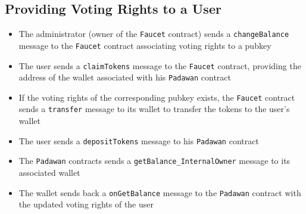 \subsection{Providing Voting Rights to a User}

\begin{itemize}
\item The administrator (owner of the {\tt Faucet} contract) sends a {\tt changeBalance} message to the {\tt Faucet} contract associating voting rights to a pubkey
\item The user sends a {\tt claimTokens} message to the {\tt Faucet} contract, providing the address of the wallet associated with his {\tt Padawan} contract
\item If the voting rights of the corresponding pubkey exists, the {\tt Faucet} contract sends a {\tt transfer} message to its wallet to transfer the tokens to the user's wallet
\item The user sends a {\tt depositTokens} message to his {\tt Padawan} contract
\item The {\tt Padawan} contracts sends a {\tt getBalance\_InternalOwner} message to its associated wallet
\item The wallet sends back a {\tt onGetBalance} message to the {\tt Padawan} contract with the updated voting rights of the user
\end{itemize}
